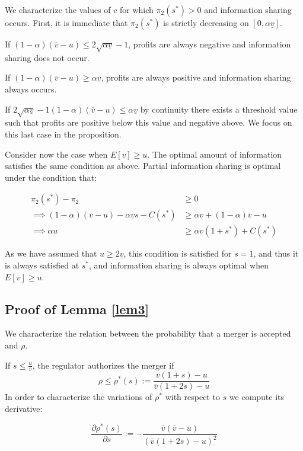 \documentclass[a4paper,leqno]{article}%
\renewcommand{\a}{\alpha}
\newcommand{\uv}{\underline{v}}
\newcommand{\ov}{\overline{v}}
\begin{document}
We characterize the values of $c$ for which $\pi_2(s^*)>0$ and information sharing occurs. First, it is immediate that $\pi_2(s^*)$ is strictly decreasing on $[0,\a\uv]$. 

If $(1-\a)(\ov -u)\leq2 \sqrt{\a \uv}-1$, profits are always negative and information sharing does not occur.

If $(1-\a)(\ov -u)\geq\a \uv$, profits are always positive and information sharing always occurs.

If $2 \sqrt{\a \uv}-1(1-\a)(\ov -u)\leq\a \uv$ by continuity there exists a threshold value such that profits are positive below this value and negative above. We focus on this last case in the proposition.


Consider now the case when $E[v]\geq u$. The optimal amount of information satisfies the same condition as above. Partial information sharing is optimal under the condition that:

\begin{equation}
    \begin{aligned}
      \pi_2(s^*)-\pi_2&\geq0\\
      \implies (1-\a)(\ov -u)-\a \uv s-C(s^*)&\geq \a\uv+(1-\a)\ov-u\\
      \implies \a u&\geq \a\uv(1+s^*)+C(s^*)
    \end{aligned}
\end{equation}

As we have assumed that $u\geq 2 \uv$, this condition is satisfied for $s=1$, and thus it is always satisfied at $s^*$, and information sharing is always optimal when $E[v]\geq u$.



\subsection{Proof of Lemma \ref{lem3}}\label{lem3p}

We characterize the relation between the probability that a merger is accepted and $\rho$.

If $s\leq \frac{u}{\ov}$, the regulator authorizes the merger if
    \begin{equation}
           \rho\leq \rho^*(s):=\frac{\ov(1+s)-u}{\ov(1+2s)-u}
    \end{equation}
In order to characterize the variations of $\rho^*$ with respect to $s$ we compute its derivative:

\[
\frac{\partial \rho^{*}(s)}{\partial s}:=-\frac{\ov(\ov-u)}{(\ov(1+2s)-u)^2}
\]
    
\end{document}
